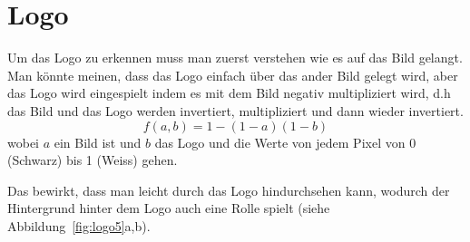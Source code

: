 \documentclass[12pt,a4paper]{report}
\begin{document}
\section{Logo}
Um das Logo zu erkennen muss man zuerst verstehen wie es auf das Bild gelangt.
Man könnte meinen, dass das Logo einfach über das ander Bild gelegt wird,
aber das Logo wird eingespielt indem es mit dem Bild negativ multipliziert wird,
d.h das Bild und das Logo werden invertiert, multipliziert und dann wieder invertiert.\cite{wiki:blend}
\[f(a,b) = 1 - (1-a)(1-b)\]
wobei $a$ ein Bild ist und $b$ das Logo und die Werte von jedem Pixel von 0 (Schwarz) bis 1 (Weiss) gehen.

Das bewirkt, dass man leicht durch das Logo hindurchsehen kann,
wodurch der Hintergrund hinter dem Logo auch eine Rolle spielt (siehe Abbildung~\ref{fig:logo5}a,b).
\begin{figure}[h]%
    \centering
    \qquad
    \qquad
    \qquad

\end{figure}
\end{document}
